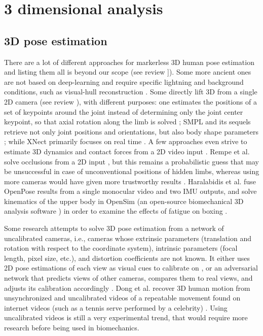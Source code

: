 \section{3 dimensional analysis}

\subsection{3D pose estimation}

There are a lot of different approaches for markerless 3D human pose estimation and listing them all is beyond our scope (see review \cite{Wang2021a}]). Some more ancient ones are not based on deep-learning and require specific lightning and background conditions, such as visual-hull reconstruction \cite{Ceseracciu2014}. Some directly lift 3D from a single 2D camera (see review \cite{Chen2020}), with different purposes: one estimates the positions of a set of keypoints around the joint instead of determining only the joint center keypoint, so that axial rotation along the limb is solved \cite{Fisch2020}; SMPL and its sequels retrieve not only joint positions and orientations, but also body shape parameters \cite{Loper2015}; while XNect primarily focuses on real time \cite{Mehta2020}. A few approaches even strive to estimate 3D dynamics and contact forces from a 2D video input \cite{Rempe2021,Li2019}. Rempe et al. solve occlusions from a 2D input \cite{Rempe2020}, but this remains a probabilistic guess that may be unsuccessful in case of unconventional positions of hidden limbs, whereas using more cameras would have given more trustworthy results . Haralabidis et al. fuse OpenPose results from a single monocular video and two IMU outputs, and solve kinematics of the upper body in OpenSim (an open-source biomechanical 3D analysis software \cite{Delp2007,Seth2018}) in order to examine the effects of fatigue on boxing \cite{Haralabidis2020}.

Some research attempts to solve 3D pose estimation from a network of uncalibrated cameras, i.e., cameras whose extrinsic parameters (translation and rotation with respect to the coordinate system), intrinsic parameters (focal length, pixel size, etc.), and distortion coefficients are not known. It either uses 2D pose estimations of each view as visual cues to calibrate on \cite{Takahashi2018}, or an adversarial network that predicts views of other cameras, compares them to real views, and adjusts its calibration accordingly \cite{Ershadi-Nasab2021}. Dong et al. recover 3D human motion from unsynchronized and uncalibrated videos of a repeatable movement found on internet videos (such as a tennis serve performed by a celebrity) \cite{Dong2020}. Using uncalibrated videos is still a very experimental trend, that would require more research before being used in biomechanics.

